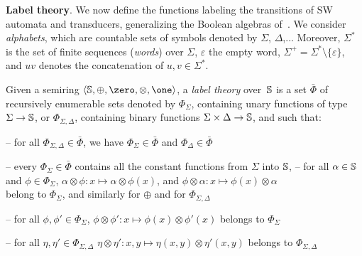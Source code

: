 %
%
\noindent
\textbf{Label theory}. We  now define the functions labeling the transitions of SW automata and transducers,
generalizing the Boolean algebras of~\cite{dAntoniVeanes17CAV}.
%
We consider \emph{alphabets}, which are countable 
sets of symbols
denoted by $\Sigma$, $\Delta$,...
Moreover, $\Sigma^*$ is the set of finite sequences (\emph{words}) over
$\Sigma$, $\varepsilon$ the empty word, $\Sigma^+ = \Sigma^* \setminus \{ \varepsilon \}$,
and $u v$ denotes the concatenation of $u, v \in \Sigma^*$.

Given a semiring $\< \Semiring, \oplus, \zero, \otimes, \one>$,
a \emph{label theory} over~$\mathbb{S}$
is a set $\bar\Phi$ of recursively enumerable sets denoted by
$\Phi_\Sigma$, %
containing unary functions of type $\Sigma \to \mathbb{S}$, %
or $\Phi_{\Sigma, \Delta}$, containing binary functions $\Sigma \times \Delta \to \mathbb{S}$,
and such that:

\noindent --
for all $\Phi_{\Sigma, \Delta} \in \bar\Phi$, we have
$\Phi_{\Sigma} \in \bar\Phi$ and $\Phi_{\Delta} \in \bar\Phi$

\noindent --
every $\Phi_{\Sigma}\in \bar\Phi$ contains all the constant functions from $\Sigma$ into $\mathbb{S}$,
\noindent --
for all $\alpha \in \mathbb{S}$ and $\phi \in \Phi_\Sigma$,
      $\alpha \otimes \phi : x \mapsto \alpha \otimes \phi(x)$,
      and $\phi \otimes \alpha : x \mapsto \phi(x) \otimes \alpha$\\
\phantom{--} belong to $\Phi_\Sigma$, and similarly for $\oplus$
      and for $\Phi_{\Sigma, \Delta}$

\noindent --
for all $\phi, \phi' \in \Phi_\Sigma$,
$\phi \otimes \phi': x \mapsto \phi(x) \otimes \phi'(x)$ belongs to $\Phi_\Sigma$

\noindent --
for all $\eta, \eta' \in \Phi_{\Sigma, \Delta}$
$\eta \otimes \eta': x, y \mapsto \eta(x, y) \otimes \eta'(x, y)$ belongs to $\Phi_{\Sigma, \Delta}$

